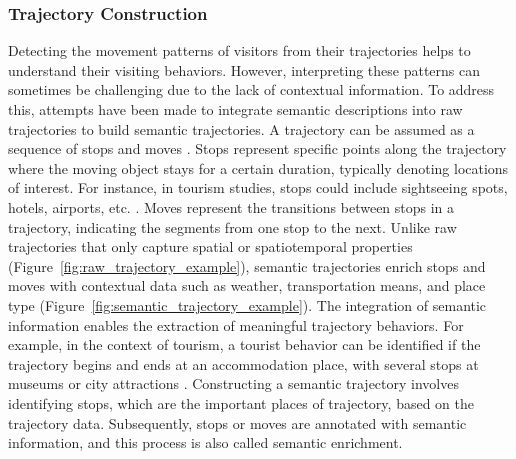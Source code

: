 \documentclass{article}
\theoremstyle{remark}
\begin{document}
 
\subsubsection{Trajectory Construction}
Detecting the movement patterns of visitors from their trajectories helps to understand their visiting behaviors. However, interpreting these patterns can sometimes be challenging due to the lack of contextual information. To address this, attempts have been made to integrate semantic descriptions into raw trajectories to build semantic trajectories. A trajectory can be assumed as a sequence of stops and moves \citep{spaccapietra_conceptual_2008}. Stops represent specific points along the trajectory where the moving object stays for a certain duration, typically denoting locations of interest. For instance, in tourism studies, stops could include sightseeing spots, hotels, airports, etc. \citep{yuan_review_2017}. Moves represent the transitions between stops in a trajectory, indicating the segments from one stop to the next. Unlike raw trajectories that only capture spatial or spatiotemporal properties (Figure~\ref{fig:raw_trajectory_example}), semantic trajectories enrich stops and moves with contextual data such as weather, transportation means, and place type (Figure~\ref{fig:semantic_trajectory_example}). The integration of semantic information enables the extraction of meaningful trajectory behaviors. For example, in the context of tourism, a tourist behavior can be identified if the trajectory begins and ends at an accommodation place, with several stops at museums or city attractions \citep{parent_semantic_2013}. Constructing a semantic trajectory involves identifying stops, which are the important places of trajectory, based on the trajectory data. Subsequently, stops or moves are annotated with semantic information, and this process is also called semantic enrichment.
\end{document}
